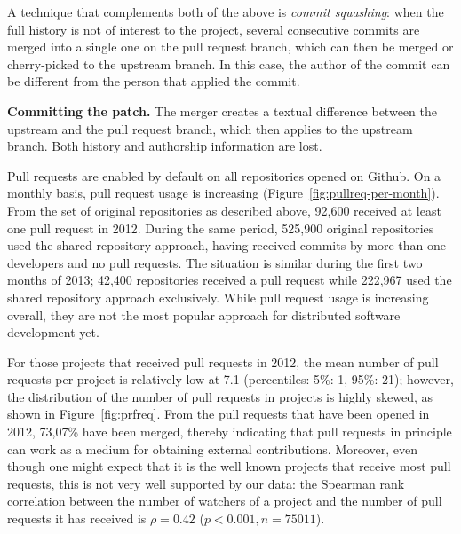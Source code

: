\documentclass{acm_proc_article-sp}
\begin{document}
    A technique that complements both of the above is \emph{commit
    squashing}: when the full history is not of interest to the project,
    several consecutive commits are merged into a single one on the pull request
    branch, which can then be merged or cherry-picked to the upstream branch. In
    this case, the author of the commit can be different from the person that
    applied the commit.

    \textbf{Committing the patch.}
    The merger creates a
    textual difference between the upstream and the pull request branch, which
    then applies to the upstream branch. Both history and authorship information
    are lost.


Pull requests are enabled by default on all repositories opened on Github. On a
monthly basis, pull request usage is increasing
(Figure~\ref{fig:pullreq-per-month}). From the set of original repositories as
described above, 92,600 received at least one pull request in 2012. During the
same period, 525,900 original repositories used the shared repository approach,
having received commits by more than one developers and no pull requests. The
situation is similar during the first two months of 2013; 42,400 repositories
received a pull request while 222,967 used the shared repository approach
exclusively. While pull request usage is increasing overall, they are not the
most popular approach for distributed software development yet.

For those projects that received pull requests in 2012, the mean number of pull
requests per project is relatively low at 7.1 (percentiles: 5\%: 1, 95\%: 21);
however, the distribution of the number of pull requests in projects is highly skewed, as
shown in Figure~\ref{fig:prfreq}.
From the pull requests that have been opened in 2012, 73,07\% have been merged,
thereby indicating that pull requests in principle can work as a medium for
obtaining external contributions. Moreover, even though one might expect that it
is the well known projects that receive most pull requests, this is not very
well supported by our data: the Spearman rank correlation between the number of
watchers of a project and the number of pull requests it has received is $\rho = 0.42$
($p < 0.001, n = 75011$).
\end{document}
